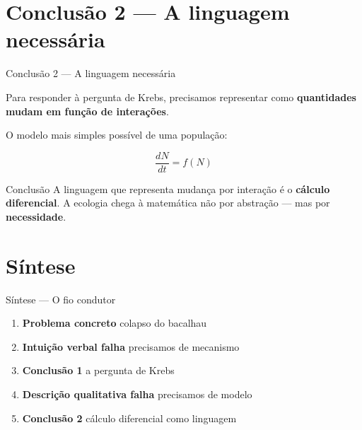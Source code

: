\documentclass[12pt]{beamer}
\begin{document}
\section{Conclusão 2 — A linguagem necessária}

\begin{frame}{Conclusão 2 — A linguagem necessária}

  Para responder à pergunta de Krebs, precisamos representar como
  \textbf{quantidades mudam em função de interações}.

  \bigskip
  O modelo mais simples possível de uma população:

  \[
    \frac{dN}{dt} = f(N)
  \]


  \bigskip
  \begin{exampleblock}{Conclusão}
    A linguagem que representa mudança por interação é o
    \textbf{cálculo diferencial}. A ecologia chega à matemática
    não por abstração --- mas por \textbf{necessidade}.
  \end{exampleblock}

\end{frame}

\section{Síntese}

\begin{frame}{Síntese — O fio condutor}

  \begin{enumerate}
    \item \textbf{Problema concreto} \hfill colapso do bacalhau
    \bigskip
    \item \textbf{Intuição verbal falha} \hfill precisamos de mecanismo
    \bigskip
    \item \textbf{Conclusão 1} \hfill a pergunta de Krebs
    \bigskip
    \item \textbf{Descrição qualitativa falha} \hfill precisamos de modelo
    \bigskip
    \item \textbf{Conclusão 2} \hfill cálculo diferencial como linguagem
  \end{enumerate}

\end{frame}
\end{document}
